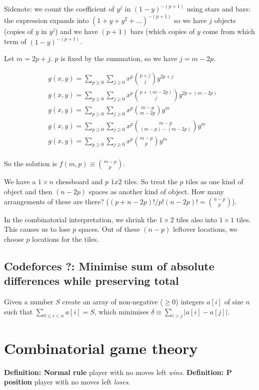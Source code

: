 \documentclass[14pt]{report}
\newcommand*{\start}[1]{\leavevmode\newline \textbf{#1} }
\begin{document}
Sidenote: we count the coefficient of $y^j$ in $(1-y)^{-(p+1)}$ using stars and bars: the expression
expands into $(1 + y + y^2 + \dots)^{-(p+1)}$ so we have $j$ objects (copies of $y$ in $y^j$) and we have $(p+1)$ bars
(which copies of $y$ come from which term of $(1 - y)^{-(p+1)}$.

Let $m = 2p + j$. $p$ is fixed by the summation, so we have $j = m-2p$.

\begin{align*}
&g(x, y) = \sum_{p \geq 0}\sum_{j\geq 0} x^p \binom{p+j}{j}y^{2p+j}  \\
&g(x, y) = \sum_{p \geq 0}\sum_{j\geq 0} x^p \binom{p+(m-2p)}{j}y^{2p+(m-2p)}  \\
&g(x, y) = \sum_{p \geq 0}\sum_{j\geq 0} x^p \binom{m-p}{m-2p}y^{m}  \\
&g(x, y) = \sum_{p \geq 0}\sum_{j\geq 0} x^p \binom{m-p}{(m - p) - (m-2p)}y^{m}  \\
&g(x, y) = \sum_{p \geq 0}\sum_{j\geq 0} x^p \binom{m-p}{p}y^{m}  \\
\end{align*}


So the solution is $f(m, p) \equiv \binom{m-p}{p}$.

We have a $1 \times n$ chessboard and $p$ $1x2$ tiles. So treat the $p$ tiles as one kind of object and then $(n-2p)$ spaces
as another kind of object. How many arrangements of these are there? ($(p + n - 2p)!/p!(n-2p)! = \binom{n-p}{p}$).

In the combinatorial interpretation, we shrink the $1\times 2$ tiles also into $1 \times 1$ tiles.
This causes us to lose $p$ spaces. Out of these $(n-p)$ leftover locations, we choose $p$ locations
for the tiles.

\section{Codeforces  ?: Minimise sum of absolute differences while preserving total}

Given a number $S$ create an array of non-negative ($\geq 0$) integers $a[i]$ of size $n$ such that $\sum_{0 \leq i < n} a[i] = S$,
which minimises $\delta \equiv \sum_{i > j} | a[i] - a[j]|$.


\chapter{Combinatorial game theory}
\start{Definition: Normal rule} player with no moves left \emph{wins}.
\start{Definition: P position} player with no moves left \emph{loses}.
\end{document}
